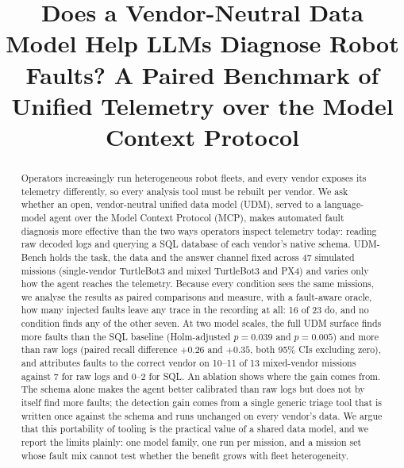 \documentclass[conference]{IEEEtran}
\begin{document}
\title{Does a Vendor-Neutral Data Model Help LLMs Diagnose Robot Faults?
A Paired Benchmark of Unified Telemetry over the Model Context Protocol}

\author{
}

\maketitle

\begin{abstract}
Operators increasingly run heterogeneous robot fleets, and every vendor exposes its
telemetry differently, so every analysis tool must be rebuilt per vendor. We ask
whether an open, vendor-neutral unified data model (UDM), served to a language-model
agent over the Model Context Protocol (MCP), makes automated fault diagnosis more
effective than the two ways operators inspect telemetry today: reading raw decoded
logs and querying a SQL database of each vendor's native schema. UDM-Bench holds
the task, the data and the answer channel fixed across 47 simulated missions
(single-vendor TurtleBot3 and mixed TurtleBot3 and PX4) and varies only how the
agent reaches the telemetry. Because every condition sees the same missions, we
analyse the results as paired comparisons and measure, with a fault-aware oracle,
how many injected faults leave any trace in the recording at all: 16 of 23 do, and
no condition finds any of the other seven. At two model scales, the full UDM surface
finds more faults than the SQL baseline (Holm-adjusted $p=0.039$ and $p=0.005$) and
more than raw logs (paired recall difference $+0.26$ and $+0.35$, both 95\% CIs
excluding zero), and attributes faults to the correct vendor on 10--11 of 13
mixed-vendor missions against 7 for raw logs and 0--2 for SQL. An ablation shows
where the gain comes from. The schema alone makes the agent better calibrated than
raw logs but does not by itself find more faults; the detection gain comes from a
single generic triage tool that is written once against the schema and runs
unchanged on every vendor's data. We argue that this portability of tooling is the
practical value of a shared data model, and we report the limits plainly: one model
family, one run per mission, and a mission set whose fault mix cannot test whether
the benefit grows with fleet heterogeneity.
\end{abstract}
\end{document}
